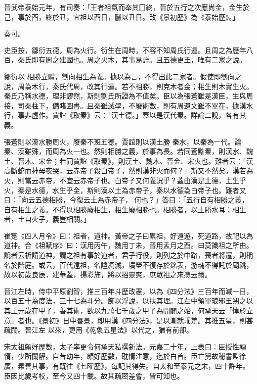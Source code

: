 \begin{pinyinscope}
 晉武帝泰始元年，有司奏：「王者祖氣而奉其囗終，晉於五行之次應尚金，金生於己，事於酉，終於丑，宜祖以酉日，臘以丑日。改《景初歷》為《泰始歷》。」



 奏可。



 史臣按，鄒衍五德，周為火行。衍生在周時，不容不知周氏行運。且周之為歷年八百，秦氏即有周之建國也。周之火木，其事易詳。且五德更王，唯有二家之說。



 鄒衍以
 相勝立體，劉向相生為義。據以為言，不得出此二家者。假使即劉向之說，周為木行，秦氏代周，改其行運。若不相勝，則克木者金；相生則木實生火。秦氏乃稱水德，理非謬然，斯則劉氏所證為不值矣。臣以為張蒼雖是漢臣，生與周接，司秦柱下，備睹圖書。且秦雖滅學，不廢術數，則有周遺文雖不畢在，據漢水行，事非虛作。賈誼《取秦》云：「漢土德。」蓋以是漢代秦。詳論二說，各有其義。



 張蒼則以漢水勝周火，廢秦不班五德。賈誼則以漢土勝
 秦水，以秦為一代。論秦、漢雖殊，而周為火一也。然則相勝之義，於事為長。若同蒼黜秦，則漢水、魏土、晉木、宋金；若同賈誼《取秦》，則漢土、魏木、晉金、宋火也。難者云：「漢高斷蛇而神母夜哭，云赤帝子殺白帝子，然則漢非火而何？」斯又不然矣。漢若為火，則當云赤帝，不宜云赤帝子也。白帝子又何義況乎？蓋由漢是土德，土生乎火，秦是水德，水生乎金，斯則漢以土為赤帝子，秦以水德為白帝子也。難者又曰：「向云五德相勝，今復云土為赤帝子，
 何也？」答曰：「五行自有相勝之義，自有相生之義。不得以相勝廢相生，相生廢相勝也。相勝者，以土勝水耳；相生者，土自火子，義豈相關。」



 崔寔《四人月令》曰：祖者，道神。黃帝之子曰累祖，好遠遊，死道路，故祀以為道神。合《祖賦序》曰：漢用丙午，魏用丁未，晉用孟月之酉。曰莫識祖之所由。說者云祈請道神，謂之祖有事於道者，君子行役，則列之於中路，喪者將遷，則稱名於階庭。或云，百代遠祖，名謚凋滅，墳塋不復存於銘表，游魂不得託於廟祧，
 故以初歲良辰，建華蓋，揚彩旌，將以招靈爽，庶眾祖之來憑云爾。



 晉江左時，侍中平原劉智，推三百年斗歷改憲，以為《四分法》三百年而減一日，以百五十為度法，三十七為斗分。飾以浮說，以扶其理。江左中領軍琅邪王朔之以其上元歲在甲子，善其術，欲以九萬七千歲之甲子為開闢之始，何承天云「悼於立意」者也。《景初》日中晷景，即用漢《四分法》，是以漸就乖差。其推五星，則甚疏闊。晉江左
 以來，更用《乾象五星法》以代之，猶有前卻。



 宋太祖頗好歷數，太子率更令何承天私撰新法。元嘉二十年，上表曰：臣授性頑惰，少所關解。自昔幼年，頗好歷數，耽情注意，迄於白首。臣亡舅故秘書監徐廣，素善其事，有既往《七曜歷》，每記其得失。自太和至泰元之末，四十許年。臣因比歲考校，至今又四十載。故其疏密差會，皆可知也。




\end{pinyinscope}
